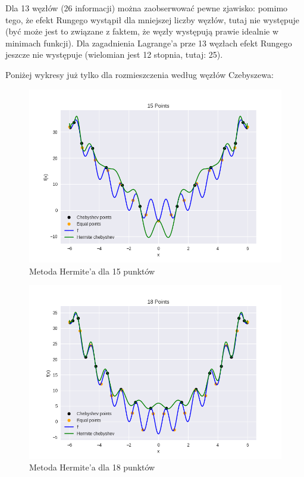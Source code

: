\documentclass{article}
\begin{document}
Dla 13 węzłów (26 informacji) można zaobserwować pewne zjawisko: pomimo tego, że efekt Rungego wystąpił dla mniejszej
liczby węzłów, tutaj nie występuje (być może jest to związane z faktem, że węzły występują prawie idealnie w minimach funkcji).
Dla zagadnienia Lagrange'a prze 13 węzłach efekt Rungego jeszcze nie występuje (wielomian jest 12 stopnia, tutaj: 25).


Poniżej wykresy już tylko dla rozmieszczenia według węzłów Czebyszewa:

\begin{figure}[H]
    \centering
    \includegraphics[width=\textwidth]{img/herm_15.png}
    \caption{Metoda Hermite'a dla 15 punktów}
\end{figure}

\begin{figure}[H]
    \centering
    \includegraphics[width=\textwidth]{img/herm_18.png}
    \caption{Metoda Hermite'a dla 18 punktów}
\end{figure}
\end{document}
